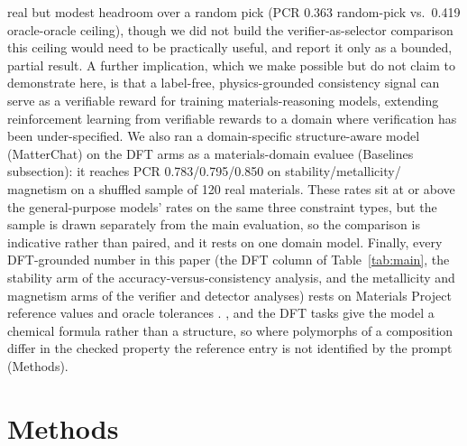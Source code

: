 \documentclass[pdflatex,sn-nature]{sn-jnl}
\newcommand{\rev}[1]{#1} %
\newcommand{\rev}[1]{{\color{blue}#1}} %
\providecommand{\DIFadd}[1]{{\protect\color{blue} \sf #1}} %
\providecommand{\DIFdel}[1]{{\protect\color{red} \scriptsize #1}} %
\providecommand{\DIFaddbegin}{} %
\providecommand{\DIFaddend}{} %
\providecommand{\DIFdelbegin}{} %
\providecommand{\DIFdelend}{} %
\providecommand{\DIFscaledelfig}{0.5}
\newlength{\DIFdelgraphicswidth} %
\newlength{\DIFdelgraphicsheight} %
\providecommand{\DIFaddincludegraphics}[2][]{{\color{blue}\fbox{\DIFOincludegraphics[#1]{#2}}}} %
\providecommand{\DIFdelincludegraphics}[2][]{%
\sbox{\DIFdelgraphicsbox}{\DIFOincludegraphics[#1]{#2}}%
\settoboxwidth{\DIFdelgraphicswidth}{\DIFdelgraphicsbox} %
\settoboxtotalheight{\DIFdelgraphicsheight}{\DIFdelgraphicsbox} %
\scalebox{\DIFscaledelfig}{%
\parbox[b]{\DIFdelgraphicswidth}{\usebox{\DIFdelgraphicsbox}\\[-\baselineskip] \rule{\DIFdelgraphicswidth}{0em}}\llap{\resizebox{\DIFdelgraphicswidth}{\DIFdelgraphicsheight}{%
\setlength{\unitlength}{\DIFdelgraphicswidth}%
\begin{picture}(1,1)%
\thicklines\linethickness{2pt} %
{\color[rgb]{1,0,0}\put(0,0){\framebox(1,1){}}}%
{\color[rgb]{1,0,0}\put(0,0){\line( 1,1){1}}}%
{\color[rgb]{1,0,0}\put(0,1){\line(1,-1){1}}}%
\end{picture}%
}\hspace*{3pt}}} %
} %
\DeclareRobustCommand{\DIFaddbegin}{\DIFOaddbegin \let\includegraphics\DIFaddincludegraphics} %
\DeclareRobustCommand{\DIFaddend}{\DIFOaddend \let\includegraphics\DIFOincludegraphics} %
\DeclareRobustCommand{\DIFdelbegin}{\DIFOdelbegin \let\includegraphics\DIFdelincludegraphics} %
\DeclareRobustCommand{\DIFdelend}{\DIFOaddend \let\includegraphics\DIFOincludegraphics} %
\begin{document}
real but modest headroom over a random pick (PCR 0.363 random-pick vs.\ 0.419 oracle-oracle
ceiling), though we did not build the verifier-as-selector comparison this ceiling would
need to be practically useful, and report it only as a bounded, partial result. A further implication,
which we make possible but do not claim to demonstrate here, is that a label-free,
physics-grounded consistency signal can serve as a verifiable reward for training
materials-reasoning models, extending reinforcement learning from verifiable rewards
to a domain where verification has been under-specified.\cite{scirlvr2026} We also ran a
domain-specific structure-aware model (MatterChat) on the DFT arms as a materials-domain
evaluee (Baselines subsection): it reaches PCR 0.783/0.795/0.850 on stability/metallicity/
magnetism on a shuffled sample of 120 real materials. These rates sit at or above the
general-purpose models' rates on the same three constraint types, but the sample is drawn
separately from the main evaluation, so the comparison is indicative rather than paired,
and it rests on one domain model. Finally,
every DFT-grounded number in this paper (the DFT column of Table~\ref{tab:main}, the
stability arm of the accuracy-versus-consistency analysis, and the metallicity and
magnetism arms of the verifier and detector analyses) rests on Materials Project
reference values and oracle tolerances\DIFdelbegin \DIFdel{.
}\DIFdelend \DIFaddbegin \DIFadd{\rev{, and the DFT tasks give the model a chemical formula
rather than a structure, so where polymorphs of a composition differ in the checked property the
reference entry is not identified by the prompt (Methods).}
}\DIFaddend 

\section*{Methods}
\end{document}
